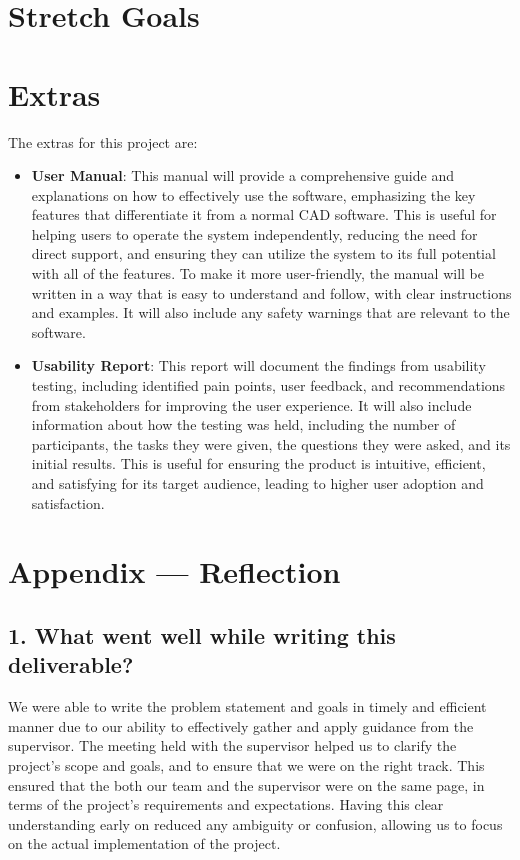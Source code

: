 \documentclass{article}
\begin{document}
\section{Stretch Goals}

\section{Extras}

The extras for this project are:

\begin{itemize}
    \item \textbf{User Manual}: This manual will provide a comprehensive guide and explanations on how to effectively use the software, emphasizing the key features that differentiate it from a normal CAD software. This is useful for helping users to operate the system independently, reducing the need for direct support, and ensuring they can utilize the system to its full potential with all of the features. To make it more user-friendly, the manual will be written in a way that is easy to understand and follow, with clear instructions and examples. It will also include any safety warnings that are relevant to the software.
    \item \textbf{Usability Report}: This report will document the findings from usability testing, including identified pain points, user feedback, and recommendations from stakeholders for improving the user experience. It will also include information about how the testing was held, including the number of participants, the tasks they were given, the questions they were asked, and its initial results. This is useful for ensuring the product is intuitive, efficient, and satisfying for its target audience, leading to higher user adoption and satisfaction.
\end{itemize}
\newpage{}

\section*{Appendix --- Reflection}

\iffalse
\wss{Not required for CAS 741}
\fi



\subsection*{1. What went well while writing this deliverable?}
We were able to write the problem statement and goals in timely and efficient manner due to our ability to effectively gather and apply guidance from the supervisor. The meeting held with the supervisor helped us to clarify the project's scope and goals, and to ensure that we were on the right track. This ensured that the both our team and the supervisor were on the same page, in terms of the project's requirements and expectations. Having this clear understanding early on reduced any ambiguity or confusion, allowing us to focus on the actual implementation of the project.
\end{document}
